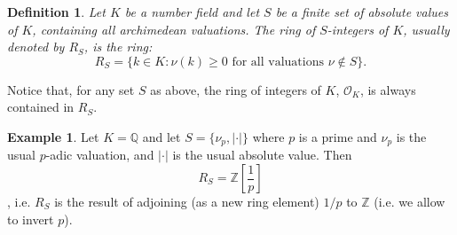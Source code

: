 \documentclass[12pt]{article}
\newtheorem*{defn}{Definition}
\theoremstyle{definition}
\newtheorem*{exa}{Example}
\newcommand{\Ints}{\mathbb{Z}}
\newcommand{\Rats}{\mathbb{Q}}
\begin{document}
\begin{defn}
Let $K$ be a number field and let $S$ be a finite set of absolute values of $K$, containing all archimedean valuations. The ring of $S$-integers of $K$, usually denoted by $R_S$, is the ring:
$$R_S=\{ k\in K : \nu(k)\geq 0 \text{ for all valuations } \nu \notin S \}.$$
\end{defn}

Notice that, for any set $S$ as above, the ring of integers of $K$, $\mathcal{O}_K$, is always contained in $R_S$.

\begin{exa}
Let $K=\Rats$ and let $S=\{\nu_p,|\cdot|\}$ where $p$ is a prime and $\nu_p$ is the usual $p$-adic valuation, and $|\cdot|$ is the usual absolute value. Then
$$R_S=\Ints\left[\frac{1}{p}\right]$$
, i.e. $R_S$ is the result of adjoining (as a new ring element) $1/p$ to $\Ints$ (i.e. we allow to invert $p$).  
\end{exa}
\end{document}
